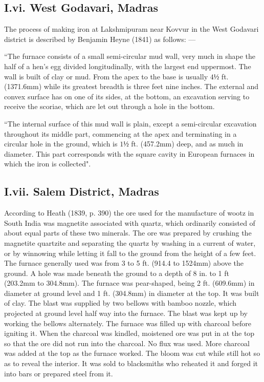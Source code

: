 \vspace{-.1cm}

\subsection*{I.vi. West Godavari, Madras}\label{subsection-6}

\vspace{-.2cm}

The process of making iron at Lakshmipuram near Kovvur in the West Godavari district is described by Benjamin Heyne (1841) as follows: — 

{\footnotesize{“The furnace consists of a small semi-circular mud wall, very much in shape the half of a hen’s egg divided longitudinally, with the largest end uppermost. The wall is built of clay or mud. From the apex to the base is usually $4½$ ft. (1371.6mm) while its greatest breadth is three feet nine inches. The external and convex surface has on one of its sides, at the bottom, an excavation serving to receive the scoriae, which are let out through a hole in the bottom.}}

{\footnotesize{``The internal surface of this mud wall is plain, except a semi-circular excavation throughout its middle part, commencing at the apex and terminating in a circular hole in the ground, which is $1½$ ft. (457.2mm) deep, and as much in diameter. This part corresponds with the square cavity in European furnaces in which the iron is collected".}} 

\vspace{-.3cm}

\subsection*{I.vii.  Salem District, Madras}\label{subsection-7}

\vspace{-.2cm}

According to Heath (1839, p. 390) the ore used for the manufacture of wootz in South India was magnetite associated with quartz, which ordinarily consisted of about equal parts of these two minerals. The ore was prepared by crushing the magnetite quartzite and separating the quartz by washing in a current of water, or by winnowing while letting it fall to the ground from the height of a few feet. The furnace generally used was from 3 to 5 ft. (914.4 to 1524mm) above the ground. A hole was made beneath the ground to a depth of 8 in. to 1 ft (203.2mm to 304.8mm). The furnace was pear-shaped, being 2 ft. (609.6mm) in diameter at ground level and 1 ft. (304.8mm) in diameter at the top. It was built of clay. The blast was supplied by two bellows with bamboo nozzle, which projected at ground level half way into the furnace. The blast was kept up by working the bellows alternately. The furnace was filled up with charcoal before igniting it. When the charcoal was kindled, moistened ore was put in at the top so that the ore did not run into the charcoal. No flux was used.  More charcoal was added at the top as the furnace worked.  The bloom was cut while still hot so as to reveal the interior. It was sold to blacksmiths who reheated it and forged it into bars or prepared steel from it.

